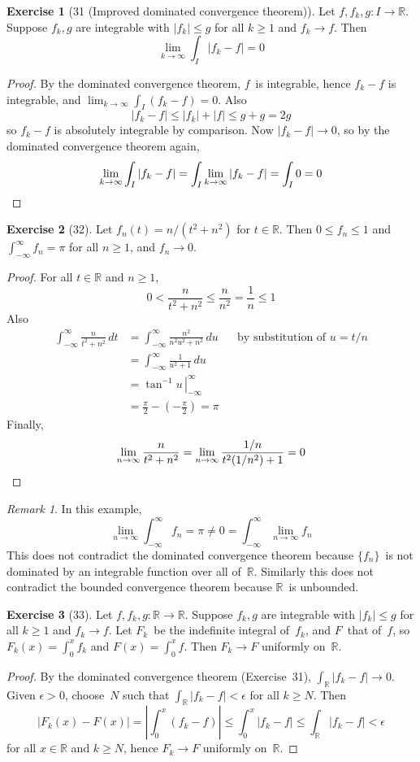 \documentclass[letterpaper,12pt]{article}
\newcommand{\R}{\mathbb{R}}
\renewcommand{\d}[1]{\,d\!{#1}}
\newcommand{\dt}{\d{t}}
\newcommand{\du}{\d{u}}
\newcommand{\abs}[1]{|{#1}|}
\newcommand{\bigabs}[1]{\left|{#1}\right|}
\theoremstyle{plain}
\theoremstyle{definition}
\newtheorem*{exer}{Exercise}
\theoremstyle{remark}
\newtheorem*{rmk}{Remark}
\begin{document}
\begin{exer}[31 (Improved dominated convergence theorem)]
Let \(f,f_k,g:I\to\R\). Suppose \(f_k,g\) are integrable with \(\abs{f_k}\le g\) for all \(k\ge 1\) and \(f_k\to f\). Then
\[\lim_{k\to\infty}\int_I\abs{f_k-f}=0\]
\end{exer}
\begin{proof}
By the dominated convergence theorem, \(f\)~is integrable, hence \(f_k-f\) is integrable, and \(\lim_{k\to\infty}\int_I(f_k-f)=0\). Also
\[\abs{f_k-f}\le\abs{f_k}+\abs{f}\le g+g=2g\]
so \(f_k-f\) is absolutely integrable by comparison. Now \(\abs{f_k-f}\to 0\), so by the dominated convergence theorem again,
\[\lim_{k\to\infty}\int_I\abs{f_k-f}=\int_I\lim_{k\to\infty}\abs{f_k-f}=\int_I 0=0\qedhere\]
\end{proof}

\begin{exer}[32]
Let \(f_n(t)=n/(t^2+n^2)\) for \(t\in\R\). Then \(0\le f_n\le 1\) and \(\int_{-\infty}^{\infty} f_n=\pi\) for all \(n\ge 1\), and \(f_n\to 0\).
\end{exer}
\begin{proof}
For all \(t\in\R\) and \(n\ge 1\),
\[0<\frac{n}{t^2+n^2}\le\frac{n}{n^2}=\frac{1}{n}\le 1\]
Also
\begin{align*}
\int_{-\infty}^{\infty}\frac{n}{t^2+n^2}\dt&=\int_{-\infty}^{\infty}\frac{n^2}{n^2u^2+n^2}\du&&\text{by substitution of \(u=t/n\)}\\
	&=\int_{-\infty}^{\infty}\frac{1}{u^2+1}\du&&\\
	&=\left.\tan^{-1}u\,\right|_{-\infty}^{\infty}&&\\
	&=\frac{\pi}{2}-\left(-\frac{\pi}{2}\right)=\pi&&
\end{align*}
Finally,
\[\lim_{n\to\infty}\frac{n}{t^2+n^2}=\lim_{n\to\infty}\frac{1/n}{t^2(1/n^2)+1}=0\qedhere\]
\end{proof}
\begin{rmk}
In this example,
\[\lim_{n\to\infty}\int_{-\infty}^{\infty} f_n=\pi\ne 0=\int_{-\infty}^{\infty}\lim_{n\to\infty} f_n\]
This does not contradict the dominated convergence theorem because \(\{f_n\}\)~is not dominated by an integrable function over all of~\(\R\). Similarly this does not contradict the bounded convergence theorem because \(\R\)~is unbounded.
\end{rmk}

\begin{exer}[33]
Let \(f,f_k,g:\R\to\R\). Suppose \(f_k,g\) are integrable with \(\abs{f_k}\le g\) for all \(k\ge 1\) and \(f_k\to f\). Let \(F_k\)~be the indefinite integral of~\(f_k\), and \(F\)~that of~\(f\), so \(F_k(x)=\int_0^x f_k\) and \(F(x)=\int_0^x f\). Then \(F_k\to F\) uniformly on~\(\R\).
\end{exer}
\begin{proof}
By the dominated convergence theorem (Exercise~31), \(\int_{\R}\abs{f_k-f}\to 0\). Given \(\epsilon>0\), choose~\(N\) such that \(\int_{\R}\abs{f_k-f}<\epsilon\) for all \(k\ge N\). Then
\[\abs{F_k(x)-F(x)}=\bigabs{\int_0^x(f_k-f)}\le\int_0^x\abs{f_k-f}\le\int_{\R}\abs{f_k-f}<\epsilon\]
for all \(x\in\R\) and \(k\ge N\), hence \(F_k\to F\) uniformly on~\(\R\).
\end{proof}
\end{document}
